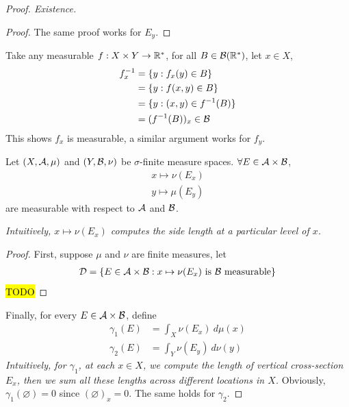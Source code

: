 \documentclass[11pt]{article}
\newcommand{\dmu}[0]{\ d\mu}
\begin{document}
\begin{theorem}
\begin{proof}[Proof. Existence]
\begin{tcolorbox}
\begin{proof}
				The same proof works for $E_y$.
			\end{proof}
			\end{tcolorbox}
			\begin{tcolorbox}
			Take any measurable $f: X \times Y \to \mathbb{R}^*$, for all $B \in \mathcal{{B}}(\mathbb{R}^*)$, let $x \in X$,
			\begin{align}
				f_x^{-1} &= \{y : f_x(y) \in B\} \\
				&= \{y : f (x, y) \in B\} \\
				&= \{y : (x, y) \in f^{-1}(B) \} \\
				&= (f^{-1}(B))_x \in \mathcal{{B}}
			\end{align}
			This shows $f_x$ is measurable, a similar argument works for $f_y$.
			\end{tcolorbox}
			\begin{tcolorbox}
				\begin{proposition}
					Let $(X, \mathcal{{A}}, \mu)$ and $(Y, \mathcal{{B}}, \nu)$ be $\sigma$-finite measure spaces. $\forall E \in \mathcal{{A}} \times \mathcal{{B}}$,
					\begin{align}
						x \mapsto \nu(E_x) \\
						y \mapsto \mu(E_y)
					\end{align}
					are measurable with respect to $\mathcal{{A}}$ and $\mathcal{{B}}$.
					
					\emph{Intuitively, $x \mapsto \nu(E_x)$ computes the side length at a particular level of $x$.}
					\begin{proof}
						First, suppose $\mu$ and $\nu$ are finite measures, let
						\begin{align}
							\mathcal{{D}} = \{E \in \mathcal{{A}} \times \mathcal{{B}} : x \mapsto \nu(E_x) \text{{ is }} \mathcal{{B}} \text{{ measurable}}\}
						\end{align}
						\hl{TODO}
					\end{proof}
				\end{proposition}
			\end{tcolorbox}
			Finally, for every $E \in \mathcal{{A}} \times \mathcal{{B}}$, define
			\begin{align}
				\gamma_1(E) &= \int_X \nu(E_x)\dmu(x) \\
				\gamma_2(E) &= \int_Y \nu(E_y)\ d\nu(y)
			\end{align}
			\emph{Intuitively, for $\gamma_1$, at each $x \in X$, we compute the length of vertical cross-section $E_x$, then we sum all these lengths across different locations in $X$.}
			Obviously, $\gamma_1(\varnothing) = 0$ since $(\varnothing)_x = 0$. The same holds for $\gamma_2$.
			

\end{proof}
\end{theorem}
\end{document}
